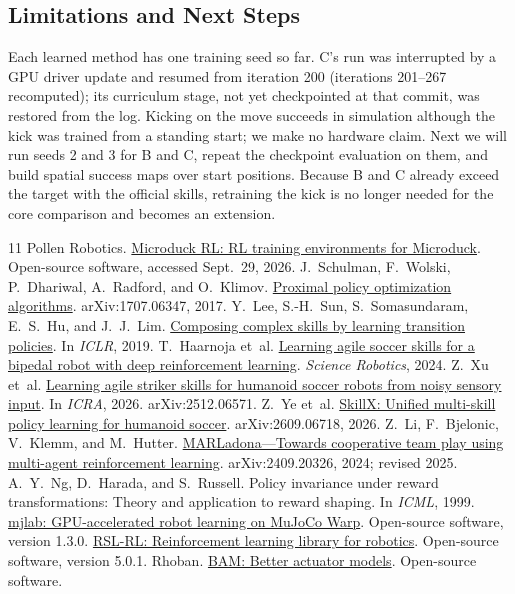 \documentclass[10pt,twocolumn,letterpaper]{article}
\begin{document}
{\subsection{Limitations and Next Steps}
Each learned method has one training seed so far. C's run was interrupted by a GPU driver update and resumed from iteration 200 (iterations 201--267 recomputed); its curriculum stage, not yet checkpointed at that commit, was restored from the log. Kicking on the move succeeds in simulation although the kick was trained from a standing start; we make no hardware claim. Next we will run seeds 2 and 3 for B and C, repeat the checkpoint evaluation on them, and build spatial success maps over start positions. Because B and C already exceed the target with the official skills, retraining the kick is no longer needed for the core comparison and becomes an extension.
\par}

\begin{thebibliography}{11}
\small
\setlength{\itemsep}{1pt}
\setlength{\parskip}{0pt}
Pollen Robotics. \href{https://github.com/pollen-robotics/microduck_rl}{Microduck RL: RL training environments for Microduck}. Open-source software, accessed Sept.\ 29, 2026.
J.~Schulman, F.~Wolski, P.~Dhariwal, A.~Radford, and O.~Klimov. \href{https://arxiv.org/abs/1707.06347}{Proximal policy optimization algorithms}. arXiv:1707.06347, 2017.
Y.~Lee, S.-H.~Sun, S.~Somasundaram, E.~S.~Hu, and J.~J.~Lim. \href{https://youngwoon.github.io/transition/}{Composing complex skills by learning transition policies}. In \emph{ICLR}, 2019.
T.~Haarnoja et~al. \href{https://doi.org/10.1126/scirobotics.adi8022}{Learning agile soccer skills for a bipedal robot with deep reinforcement learning}. \emph{Science Robotics}, 2024.
Z.~Xu et~al. \href{https://arxiv.org/abs/2512.06571}{Learning agile striker skills for humanoid soccer robots from noisy sensory input}. In \emph{ICRA}, 2026. arXiv:2512.06571.
Z.~Ye et~al. \href{https://arxiv.org/abs/2609.06718}{SkillX: Unified multi-skill policy learning for humanoid soccer}. arXiv:2609.06718, 2026.
Z.~Li, F.~Bjelonic, V.~Klemm, and M.~Hutter. \href{https://arxiv.org/abs/2409.20326}{MARLadona---Towards cooperative team play using multi-agent reinforcement learning}. arXiv:2409.20326, 2024; revised 2025.
{\color{blue}
A.~Y.~Ng, D.~Harada, and S.~Russell. Policy invariance under reward transformations: Theory and application to reward shaping. In \emph{ICML}, 1999.
\href{https://github.com/mujocolab/mjlab}{mjlab: GPU-accelerated robot learning on MuJoCo Warp}. Open-source software, version 1.3.0.
\href{https://github.com/leggedrobotics/rsl_rl}{RSL-RL: Reinforcement learning library for robotics}. Open-source software, version 5.0.1.
Rhoban. \href{https://github.com/Rhoban/bam}{BAM: Better actuator models}. Open-source software.
}
\end{thebibliography}
\end{document}
